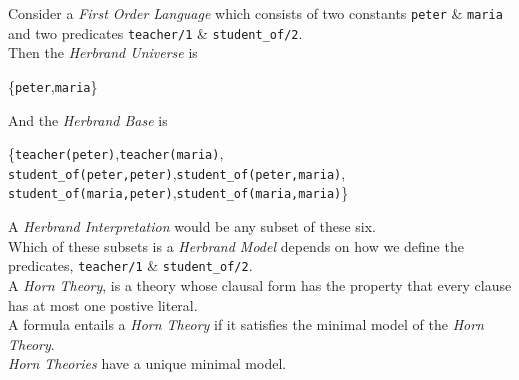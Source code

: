 \documentclass[11pt,a4paper]{article}
\begin{document}
Consider a \textit{First Order Language} which consists of two constants \lstinline!peter! \& \lstinline!maria! and two predicates \lstinline!teacher/1! \& \lstinline!student_of/2!.\\
Then the \textit{Herbrand Universe} is
\begin{center}
\{\lstinline!peter!,\lstinline!maria!\}
\end{center}
And the \textit{Herbrand Base} is
\begin{center}
\{\lstinline!teacher(peter)!,\lstinline!teacher(maria)!,\\
\lstinline!student_of(peter,peter)!,\lstinline!student_of(peter,maria)!,\\
\lstinline!student_of(maria,peter)!,\lstinline!student_of(maria,maria)!\}
\end{center}
A \textit{Herbrand Interpretation} would be any subset of these six.\\
Which of these subsets is a \textit{Herbrand Model} depends on how we define the predicates, \lstinline!teacher/1! \& \lstinline!student_of/2!.\\

A \textit{Horn Theory}, is a theory whose clausal form has the property that every clause has at most one postive literal.\\
\nb A formula entails a \textit{Horn Theory} if it satisfies the minimal model of the \textit{Horn Theory}.\\
\nb \textit{Horn Theories} have a unique minimal model.\\
\end{document}
